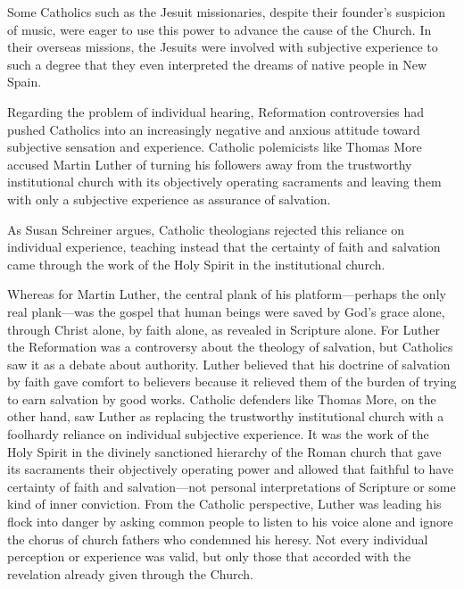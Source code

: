 Some Catholics such as the Jesuit missionaries, despite their founder's
suspicion of music, were eager to use this power to advance the cause of the
Church.
In their overseas missions, the Jesuits were involved with subjective experience
to such a degree that they even interpreted the dreams of native people in New
Spain.%
    \Autocite[40--41]{Bailey:Art}

Regarding the problem of individual hearing, Reformation controversies had
pushed Catholics into an increasingly negative and anxious attitude toward
subjective sensation and experience.
Catholic polemicists like Thomas More accused Martin Luther of turning his
followers away from the trustworthy institutional church with its objectively
operating sacraments and leaving them with only a subjective experience as
assurance of salvation.


As Susan Schreiner argues, Catholic theologians rejected this reliance on
individual experience, teaching instead that the certainty of faith and
salvation came through the work of the Holy Spirit in the institutional church.%
    \Autocite[131--208]{Schreiner:Certainty}

Whereas for Martin Luther, the central plank of his platform---perhaps the only
real plank---was the gospel that human beings were saved by God's grace alone,
through Christ alone, by faith alone, as revealed in Scripture alone.
For Luther the Reformation was a controversy about the theology of salvation,
but Catholics saw it as a debate about authority.%
    \Autocite{Schreiner:Certainty}
Luther believed that his doctrine of salvation by faith gave comfort to
believers because it relieved them of the burden of trying to earn salvation by
good works.%
Catholic defenders like Thomas More, on the other hand, saw Luther as replacing
the trustworthy institutional church with a foolhardy reliance on individual
subjective experience.%
It was the work of the Holy Spirit in the divinely sanctioned hierarchy of the
Roman church that gave its sacraments their objectively operating power and
allowed that faithful to have certainty of faith and salvation---not personal
interpretations of Scripture or some kind of inner conviction.%
    \Autocite[131--208]{Schreiner:Certainty}
From the Catholic perspective, Luther was leading his flock into danger by
asking common people to listen to his voice alone and ignore the chorus of
church fathers who condemned his heresy.
Not every individual perception or experience was valid, but only those that
accorded with the revelation already given through the Church.


